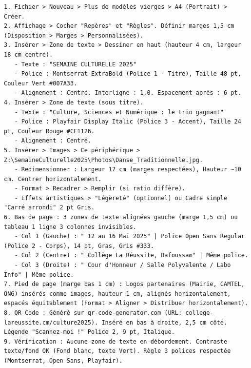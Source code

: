 \documentclass[11pt]{article}
\begin{document}
\begin{exoresolu}
\begin{lstlisting}[language=text, title={Journal d'actions Publisher - Affiche}]
1. Fichier > Nouveau > Plus de modèles vierges > A4 (Portrait) > Créer.
2. Affichage > Cocher "Repères" et "Règles". Définir marges 1,5 cm (Disposition > Marges > Personnalisées).
3. Insérer > Zone de texte > Dessiner en haut (hauteur 4 cm, largeur 18 cm centré).
   - Texte : "SEMAINE CULTURELLE 2025"
   - Police : Montserrat ExtraBold (Police 1 - Titre), Taille 48 pt, Couleur Vert #007A33.
   - Alignement : Centré. Interligne : 1,0. Espacement après : 6 pt.
4. Insérer > Zone de texte (sous titre).
   - Texte : "Culture, Sciences et Numérique : le trio gagnant"
   - Police : Playfair Display Italic (Police 3 - Accent), Taille 24 pt, Couleur Rouge #CE1126.
   - Alignement : Centré.
5. Insérer > Images > Ce périphérique > Z:\SemaineCulturelle2025\Photos\Danse_Traditionnelle.jpg.
   - Redimensionner : Largeur 17 cm (marges respectées), Hauteur ~10 cm. Centrer horizontalement.
   - Format > Recadrer > Remplir (si ratio diffère).
   - Effets artistiques > "Légèreté" (optionnel) ou Cadre simple "Carré arrondi" 2 pt Gris.
6. Bas de page : 3 zones de texte alignées gauche (marge 1,5 cm) ou tableau 1 ligne 3 colonnes invisibles.
   - Col 1 (Gauche) : " 12 au 16 Mai 2025" | Police Open Sans Regular (Police 2 - Corps), 14 pt, Gras, Gris #333.
   - Col 2 (Centre) : " Collège La Réussite, Bafoussam" | Même police.
   - Col 3 (Droite) : " Cour d'Honneur / Salle Polyvalente / Labo Info" | Même police.
7. Pied de page (marge bas 1 cm) : Logos partenaires (Mairie, CAMTEL, ONG) insérés comme images, hauteur 1 cm, alignés horizontalement, espacés équitablement (Format > Aligner > Distribuer horizontalement).
8. QR Code : Généré sur qr-code-generator.com (URL: college-lareussite.cm/culture2025). Inséré en bas à droite, 2,5 cm côté. Légende "Scannez-moi !" Police 2, 9 pt, Italique.
9. Vérification : Aucune zone de texte en débordement. Contraste texte/fond OK (Fond blanc, texte Vert). Règle 3 polices respectée (Montserrat, Open Sans, Playfair).
\end{lstlisting}


\end{exoresolu}
\end{document}
